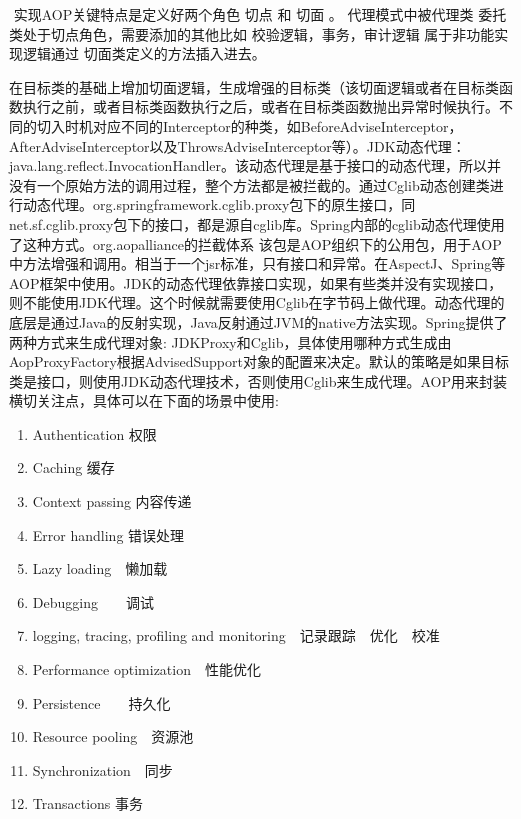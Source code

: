 \documentclass[../../../interview-questions.tex]{subfiles}
\begin{document}
​ 实现AOP关键特点是定义好两个角色 切点 和 切面 。 代理模式中被代理类 委托类处于切点角色，需要添加的其他比如 校验逻辑，事务，审计逻辑 属于非功能实现逻辑通过 切面类定义的方法插入进去。

在目标类的基础上增加切面逻辑，生成增强的目标类（该切面逻辑或者在目标类函数执行之前，或者目标类函数执行之后，或者在目标类函数抛出异常时候执行。不同的切入时机对应不同的Interceptor的种类，如BeforeAdviseInterceptor，AfterAdviseInterceptor以及ThrowsAdviseInterceptor等）。JDK动态代理：java.lang.reflect.InvocationHandler。该动态代理是基于接口的动态代理，所以并没有一个原始方法的调用过程，整个方法都是被拦截的。通过Cglib动态创建类进行动态代理。org.springframework.cglib.proxy包下的原生接口，同net.sf.cglib.proxy包下的接口，都是源自cglib库。Spring内部的cglib动态代理使用了这种方式。org.aopalliance的拦截体系
该包是AOP组织下的公用包，用于AOP中方法增强和调用。相当于一个jsr标准，只有接口和异常。在AspectJ、Spring等AOP框架中使用。JDK的动态代理依靠接口实现，如果有些类并没有实现接口，则不能使用JDK代理。这个时候就需要使用Cglib在字节码上做代理。动态代理的底层是通过Java的反射实现，Java反射通过JVM的native方法实现。Spring提供了两种方式来生成代理对象: JDKProxy和Cglib，具体使用哪种方式生成由AopProxyFactory根据AdvisedSupport对象的配置来决定。默认的策略是如果目标类是接口，则使用JDK动态代理技术，否则使用Cglib来生成代理。AOP用来封装横切关注点，具体可以在下面的场景中使用:

\begin{enumerate}
    \item {Authentication 权限}
    \item {Caching 缓存}
    \item {Context passing 内容传递}
    \item {Error handling 错误处理}
    \item {Lazy loading　懒加载}
    \item {Debugging　　调试}
    \item {logging, tracing, profiling and monitoring　记录跟踪　优化　校准}
    \item {Performance optimization　性能优化}
    \item {Persistence　　持久化}
    \item {Resource pooling　资源池}
    \item {Synchronization　同步}
    \item {Transactions 事务}
\end{enumerate}
\end{document}
